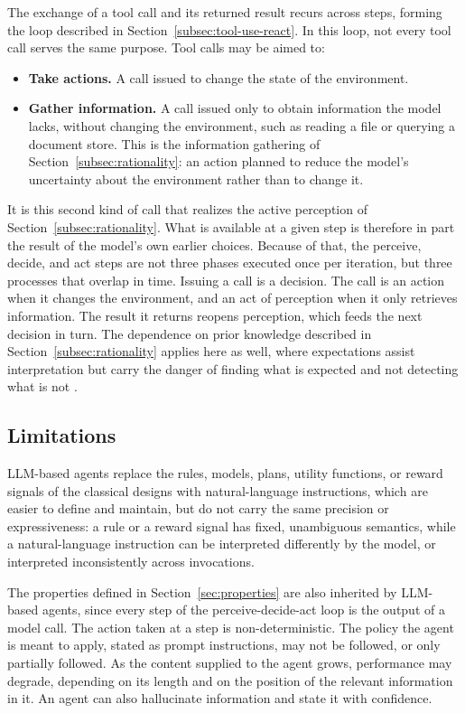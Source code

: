 The exchange of a tool call and its returned result recurs across steps, forming the loop described in Section~\ref{subsec:tool-use-react}. In this loop, not every tool call serves the same purpose. Tool calls may be aimed to:

\begin{itemize}
	\item \textbf{Take actions.} A call issued to change the state of the environment.
	\item \textbf{Gather information.} A call issued only to obtain information the model lacks, without changing the environment, such as reading a file or querying a document store. This is the information gathering of Section~\ref{subsec:rationality}: an action planned to reduce the model's uncertainty about the environment rather than to change it.
\end{itemize}

It is this second kind of call that realizes the active perception of Section~\ref{subsec:rationality}. What is available at a given step is therefore in part the result of the model's own earlier choices. Because of that, the perceive, decide, and act steps are not three phases executed once per iteration, but three processes that overlap in time. Issuing a call is a decision. The call is an action when it changes the environment, and an act of perception when it only retrieves information. The result it returns reopens perception, which feeds the next decision in turn. The dependence on prior knowledge described in Section~\ref{subsec:rationality} applies here as well, where expectations assist interpretation but carry the danger of finding what is expected and not detecting what is not \cite{bajcsyActivePerception1988}.

\subsection{Limitations}
\label{subsec:llm-agent-fit}

LLM-based agents replace the rules, models, plans, utility functions, or reward signals of the classical designs with natural-language instructions, which are easier to define and maintain, but do not carry the same precision or expressiveness: a rule or a reward signal has fixed, unambiguous semantics, while a natural-language instruction can be interpreted differently by the model, or interpreted inconsistently across invocations.

The properties defined in Section~\ref{sec:properties} are also inherited by LLM-based agents, since every step of the perceive-decide-act loop is the output of a model call. The action taken at a step is non-deterministic. The policy the agent is meant to apply, stated as prompt instructions, may not be followed, or only partially followed. As the content supplied to the agent grows, performance may degrade, depending on its length and on the position of the relevant information in it. An agent can also hallucinate information and state it with confidence.

